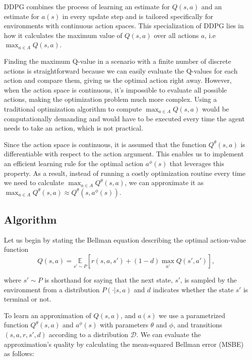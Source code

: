 DDPG combines the process of learning an estimate for $Q(s,a)$ and an estimate for $a(s)$ in every update step and is tailored specifically for environments with continuous action spaces. This specialization of DDPG lies in how it calculates the maximum value of $Q(s,a)$ over all actions $a$, i.e  $\max_{a \in A} Q(s,a)$.

Finding the maximum Q-value in a scenario with a finite number of discrete actions is straightforward because we can easily evaluate the Q-values for each action and compare them, giving us the optimal action right away. However, when the action space is continuous, it's impossible to evaluate all possible actions, making the optimization problem much more complex. Using a traditional optimization algorithm to compute $\max_{a \in A} Q(s,a)$ would be computationally demanding and would have to be executed every time the agent needs to take an action, which is not practical.

Since the action space is continuous, it is assumed that the function $Q^{\theta}(s,a)$ is differentiable with respect to the action argument. This enables us to implement an efficient learning rule for the optimal action $a^\phi(s)$ that leverages this property. As a result, instead of running a costly optimization routine every time we need to calculate $\max_{a \in A} Q^\theta(s,a)$, we can approximate it as $\max_{a \in A} Q^\theta(s,a) \approx Q^\theta(s,a^\phi(s))$. 


\subsection{Algorithm}

Let us begin by stating the Bellman equation describing the optimal action-value function \cite{bellman1957dynamic} 
\begin{equation}
 Q(s,a) = \underset{s' \sim P}{{\mathbb E}}\left[r(s,a,s') +      (1-d)\max_{a'} Q(s', a')\right],   
\end{equation}


where $s' \sim P$ is shorthand for saying that the next state, $s'$, is sampled by the environment from a distribution $P(\cdot| s,a)$ and $d$ indicates whether the state $s'$ is terminal or not.

To learn an approximation of $Q(s,a)$, and $a(s)$ we use a parametrized function $Q^{\theta}(s,a)$ and $a^\phi(s)$ with parameters $\theta$ and $\phi$, and transitions $ (s,a,r,s',d)$ according to a distribution ${\mathcal D}$. We can evaluate the approximation's quality by calculating the mean-squared Bellman error (MSBE) as follows:


